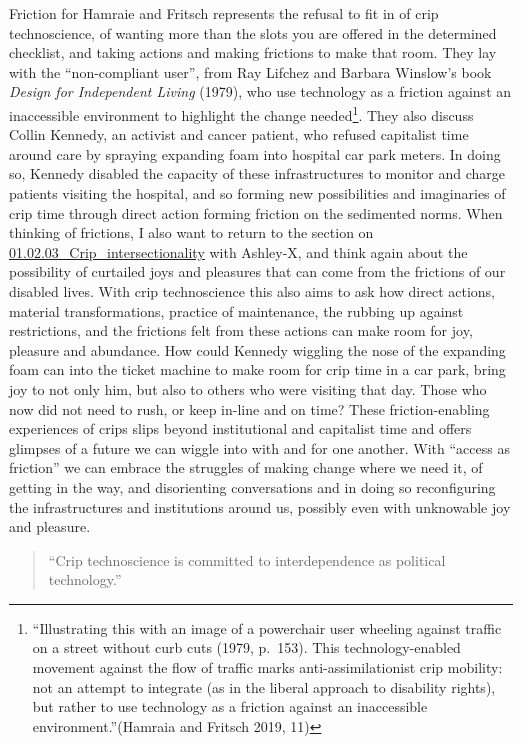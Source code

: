 Friction for Hamraie and Fritsch represents the refusal to fit in of
crip technoscience, of wanting more than the slots you are offered in
the determined checklist, and taking actions and making frictions to
make that room. They lay with the ``non-compliant user'', from Ray
Lifchez and Barbara Winslow's book \emph{Design for Independent Living}
(1979), who use technology as a friction against an inaccessible
environment to highlight the change needed\footnote{``Illustrating this
  with an image of a powerchair user wheeling against traffic on a
  street without curb cuts (1979, p.~153). This technology-enabled
  movement against the flow of traffic marks anti-assimilationist crip
  mobility: not an attempt to integrate (as in the liberal approach to
  disability rights), but rather to use technology as a friction against
  an inaccessible environment.''(Hamraia and Fritsch 2019, 11)}. They
also discuss Collin Kennedy, an activist and cancer patient, who refused
capitalist time around care by spraying expanding foam into hospital car
park meters. In doing so, Kennedy disabled the capacity of these
infrastructures to monitor and charge patients visiting the hospital,
and so forming new possibilities and imaginaries of crip time through
direct action forming friction on the sedimented norms. When thinking of
frictions, I also want to return to the section on
\href{01.02.03_Crip_intersectionality.md}{01.02.03\_Crip\_intersectionality}
with Ashley-X, and think again about the possibility of curtailed joys
and pleasures that can come from the frictions of our disabled lives.
With crip technoscience this also aims to ask how direct actions,
material transformations, practice of maintenance, the rubbing up
against restrictions, and the frictions felt from these actions can make
room for joy, pleasure and abundance. How could Kennedy wiggling the
nose of the expanding foam can into the ticket machine to make room for
crip time in a car park, bring joy to not only him, but also to others
who were visiting that day. Those who now did not need to rush, or keep
in-line and on time? These friction-enabling experiences of crips slips
beyond institutional and capitalist time and offers glimpses of a future
we can wiggle into with and for one another. With ``access as friction''
we can embrace the struggles of making change where we need it, of
getting in the way, and disorienting conversations and in doing so
reconfiguring the infrastructures and institutions around us, possibly
even with unknowable joy and pleasure.

\begin{quote}
``Crip technoscience is committed to interdependence as political
technology.''
\end{quote}

